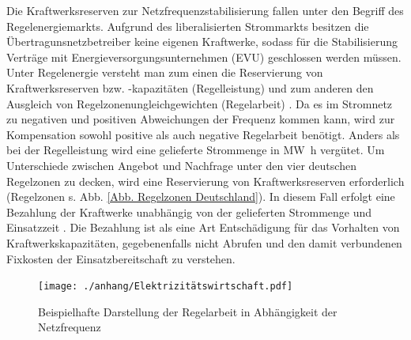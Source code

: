 		Die Kraftwerksreserven zur Netzfrequenzstabilisierung fallen unter den Begriff des Regelenergiemarkts.
		Aufgrund des liberalisierten Strommarkts besitzen die Übertragunsnetzbetreiber keine eigenen Kraftwerke, sodass für die Stabilisierung Verträge mit Energieversorgungsunternehmen (EVU) geschlossen werden müssen. \\
			
		Unter Regelenergie versteht man zum einen die Reservierung von Kraftwerksreserven bzw. -kapazitäten (Regelleistung) und zum anderen den Ausgleich von Regelzonenungleichgewichten (Regelarbeit) \parencite{Elektrizitätswirtschaft}.
		Da es im Stromnetz zu negativen und positiven Abweichungen der Frequenz kommen kann, wird zur Kompensation sowohl positive als auch negative Regelarbeit benötigt.
		Anders als bei der Regelleistung wird eine gelieferte Strommenge in \si{\mega\watt\hour} vergütet.
		Um Unterschiede zwischen Angebot und Nachfrage unter den vier deutschen Regelzonen zu decken, wird eine Reservierung von Kraftwerksreserven erforderlich (Regelzonen s. Abb. \ref{Abb. Regelzonen Deutschland}). 
		In diesem Fall erfolgt eine Bezahlung der Kraftwerke unabhängig von der gelieferten Strommenge und Einsatzzeit \parencite{Elektrizitätswirtschaft}. 
		Die Bezahlung ist als eine Art Entschädigung für das Vorhalten von Kraftwerkskapazitäten, gegebenenfalls nicht Abrufen und den damit verbundenen Fixkosten der Einsatzbereitschaft zu verstehen.   
		
		\begin{figure} [H]
			\centering
			\label{Abb. Beispielhafte Darstellung der Regelenergie in Abhängigkeit der Netzfrequenz}
			\texttt{[image: ./anhang/Elektrizitätswirtschaft.pdf]}
			\caption{Beispielhafte Darstellung der Regelarbeit in Abhängigkeit der Netzfrequenz \parencite{Elektrizitätswirtschaft}}
		\end{figure}
	

